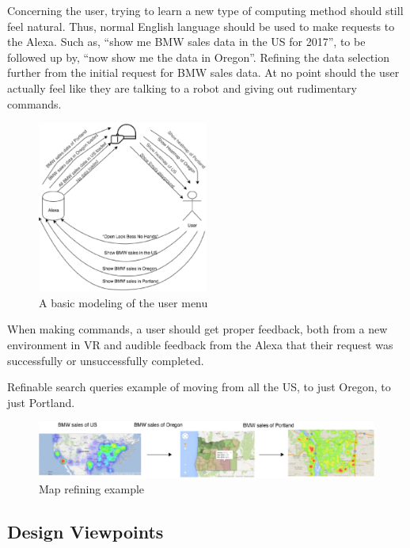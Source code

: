 \documentclass[onecolumn, draftclsnofoot,10pt, compsoc]{IEEEtran}
\begin{document}
        Concerning the user, trying to learn a new type of computing method should still feel natural. Thus, normal English language should be used to make requests to the Alexa. Such as, “show me BMW sales data in the US for 2017”, to be followed up by, “now show me the data in Oregon”. Refining the data selection further from the initial request for BMW sales data. At no point should the user actually feel like they are talking to a robot and giving out rudimentary commands.
        
        \begin{figure}
            \centering
            \includegraphics[width=0.5\textwidth]{VR_diagram.eps}
            \caption{A basic modeling of the user menu}
            \label{vr diagram}
        \end{figure}
        
        When making commands, a user should get proper feedback, both from a new environment in VR and audible feedback from the Alexa that their request was successfully or unsuccessfully completed. 
        
        Refinable search queries example of moving from all the US, to just Oregon, to just Portland.
        
        \begin{figure}
            \centering
            \includegraphics[width=1\textwidth]{Map_diagram.eps}
            \caption{Map refining example}
            \label{fig:map}
        \end{figure}


    \subsection{Design Viewpoints}
\end{document}
